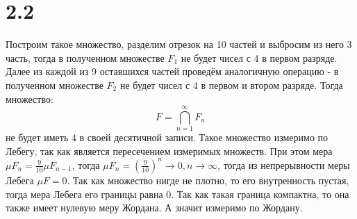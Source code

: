 \documentclass[12pt]{article}
\begin{document}
\section{2.2}
Построим такое множество, разделим отрезок на 10 частей и выбросим из него 3 часть, тогда в полученном 
множестве $F_1$ не будет чисел с 4 в первом разряде. Далее из каждой из 9 оставшихся частей проведём аналогичную операцию - 
в полученном множестве $F_2$ не будет чисел с 4 в первом и втором разряде. Тогда множество:
\[
    F = \bigcap_{n=1}^{\infty} F_n
\]  
не будет иметь 4 в своей десятичной записи. Такое множество измеримо по Лебегу, так как является 
пересечением измеримых множеств. При этом мера $\mu F_n = \frac{9}{10} \mu F_{n-1}$, тогда 
$\mu F_n = \left( \frac{9}{10} \right)^n \to 0, n \to \infty$, тогда из непрерывности меры Лебега 
$\mu F = 0$. Так как множество нигде не плотно, то его внутренность пустая, тогда мера Лебега его 
границы равна $0$. Так как такая граница компактна, то она также имеет нулевую меру Жордана. А значит измеримо по 
Жордану. 
\end{document}
